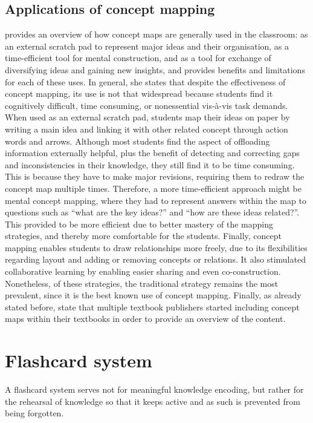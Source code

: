\subsection{Applications of concept mapping}

 provides an overview of how concept maps are generally used in the classroom: as an external scratch pad to represent major ideas and their organisation, as a time-efficient tool for mental construction, and as a tool for exchange of diversifying ideas and gaining new insights, and provides benefits and limitations for each of these uses. In general, she states that despite the effectiveness of concept mapping, its use is not that widespread because students find it cognitively difficult, time consuming, or nonessential vis-\`{a}-vis task demands. When used as an external scratch pad, students map their ideas on paper by writing a main idea and linking it with other related concept through action words and arrows. Although most students find the aspect of offloading information externally helpful, plus the benefit of detecting and correcting gaps and inconsistencies in their knowledge, they still find it to be time consuming. This is because they have to make major revisions, requiring them to redraw the concept map multiple times. Therefore, a more time-efficient approach might be mental concept mapping, where they had to represent answers within the map to questions such as ``what are the key ideas?'' and ``how are these ideas related?''. This provided to be more efficient due to better mastery of the mapping strategies, and thereby more comfortable for the students. Finally, concept mapping enables students to draw relationships more freely, due to its flexibilities regarding layout and adding or removing concepts or relations. It also stimulated collaborative learning by enabling easier sharing and even co-construction. Nonetheless, of these strategies, the traditional strategy remains the most prevalent, since it is the best known use of concept mapping. Finally, as already stated before,  state that multiple textbook publishers started including concept maps within their textbooks in order to provide an overview of the content.

\section{Flashcard system}

A flashcard system serves not for meaningful knowledge encoding, but rather for the rehearsal of knowledge so that it keeps active and as such is prevented from being forgotten.

